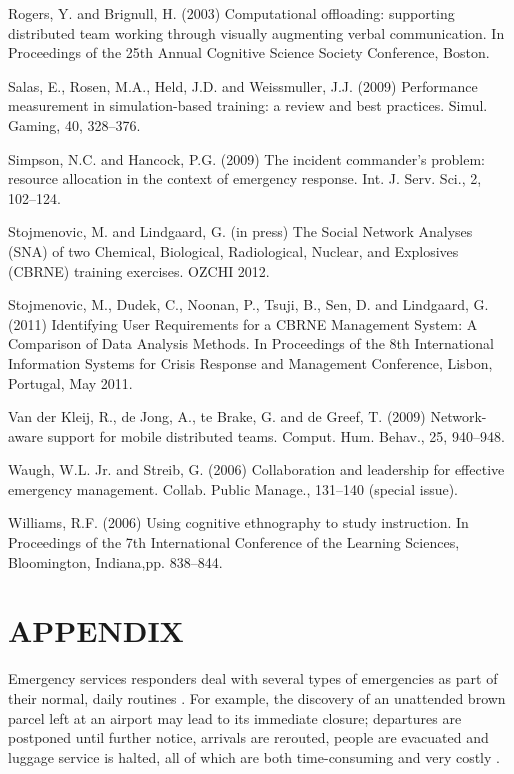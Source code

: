 \documentclass[link]{IWCOMP}
\begin{document}
\begin{thebibliography}{99}
Rogers, Y. and Brignull, H. (2003)
Computational offloading: supporting distributed team
working through visually augmenting verbal communication.
In Proceedings of the 25th Annual Cognitive Science Society
Conference, Boston.

Salas, E., Rosen, M.A., Held, J.D. and
Weissmuller, J.J. (2009) Performance measurement in
simulation-based training: a review and best practices.
Simul. Gaming, 40, 328--376.

Simpson, N.C. and Hancock, P.G. (2009) The
incident commander's problem: resource allocation in the
context of emergency response. Int. J. Serv. Sci., 2,
102--124.

Stojmenovic, M. and Lindgaard, G. (in
press) The Social Network Analyses (SNA) of two Chemical,
Biological, Radiological, Nuclear, and Explosives (CBRNE)
training exercises. OZCHI 2012.

Stojmenovic, M., Dudek, C., Noonan, P.,
Tsuji, B., Sen, D. and Lindgaard, G. (2011) Identifying
User Requirements for a CBRNE Management System: A
Comparison of Data Analysis Methods. In Proceedings of the
8th International Information Systems for Crisis Response
and Management Conference, Lisbon, Portugal, May 2011.

Van der Kleij, R., de Jong, A., te Brake,
G. and de Greef, T. (2009) Network-aware support for mobile
distributed teams. Comput. Hum. Behav., 25, 940--948.

Waugh, W.L. Jr. and Streib, G. (2006)
Collaboration and leadership for effective emergency
management. Collab. Public Manage., 131--140 (special
issue).

Williams, R.F. (2006) Using cognitive
ethnography to study instruction. In Proceedings of the 7th
International Conference of the Learning Sciences,
Bloomington, Indiana,\break pp. 838--844.
\end{thebibliography}

\appendix

\section*{APPENDIX}

Emergency services responders deal with several types of emergencies as part
of their normal, daily routines \citep{bib18}. For example, the
discovery of an unattended brown parcel left at an airport may lead to its
immediate closure; departures are postponed until further notice, arrivals
are rerouted, people are evacuated and luggage service is halted, all of
which are both time-consuming and very costly \citep{bib37}.
\end{document}
